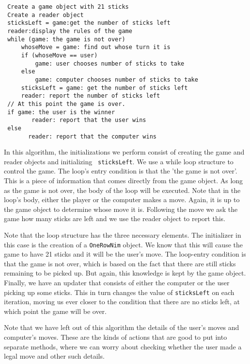 \begin{jjjlisting}
\begin{lstlisting}
 Create a game object with 21 sticks
 Create a reader object
 sticksLeft = game:get the number of sticks left
 reader:display the rules of the game 
 while (game: the game is not over)       
     whoseMove = game: find out whose turn it is
     if (whoseMove == user)
         game: user chooses number of sticks to take
     else
         game: computer chooses number of sticks to take 
     sticksLeft = game: get the number of sticks left
     reader: report the number of sticks left
 // At this point the game is over.
 if game: the user is the winner
        reader: report that the user wins
 else 
       reader: report that the computer wins
\end{lstlisting}
\end{jjjlisting}

\noindent In this algorithm, the initializations we perform consist
of creating the game and reader objects and initializing {\tt
sticksLeft}. We use a while loop structure to control the game.  The
loop's entry condition is that the 'the game is not over'.  This is a
piece of information that comes directly from the game object.  As
long as the game is not over, the body of the loop will be
executed. Note that in the loop's body, either the player or the
computer makes a move. Again, it is up to the game object to determine
whose move it is.  Following the move we ask the game how many sticks
are left and we use the reader object to report this.

Note that the loop structure has the three necessary elements. The
initializer in this case is the creation of a {\tt OneRowNim}
object. We know that this will cause the game to have 21 sticks and
it will be the user's move. The loop-entry condition is that the
game is not over, which is based on the fact that there are still
sticks remaining to be picked up. But again, this knowledge is kept by
the game object. Finally, we have an updater that consists of either
the computer or the user picking up some sticks. This in turn changes
the value of {\tt sticksLeft} on each iteration, moving us ever closer
to the condition that there are no sticks left, at which point
the game will be over. 

Note that we have left out of this algorithm the details of the user's
moves and computer's moves. These are the kinds of actions that are
good to put into separate methods, where we can worry about checking
whether the user made a legal move and other such details.

